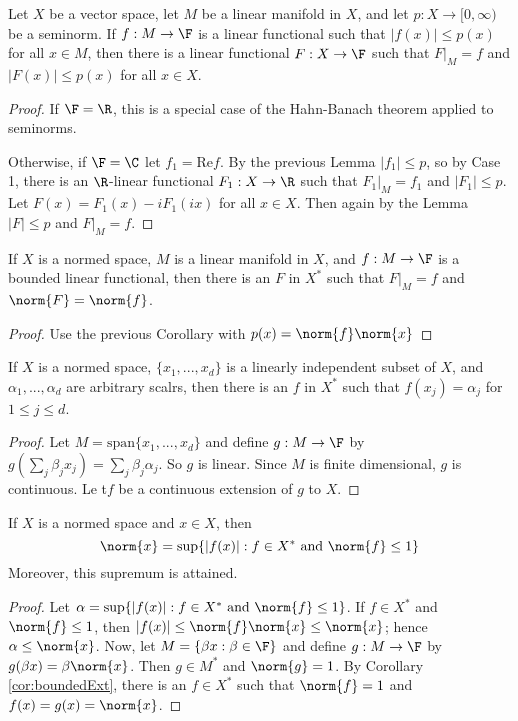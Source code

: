 \begin{cor}
    Let $X$ be a vector space, let $M$ be a linear manifold in $X$, and let $p:X\rightarrow [0,\infty)$ be a seminorm. If $f:M\rightarrow \F$ is a linear functional such that $|f(x)| \leq p(x)$ for all $x \in M$, then there is a linear functional $F:X\rightarrow \F$ such that $F\vert_M = f$ and $|F(x)| \leq p(x)$ for all $x \in X$.
\end{cor}
\begin{proof}
    If $\F = \R$, this is a special case of the Hahn-Banach theorem applied to seminorms.

    Otherwise, if $\F = \C$ let $f_1 = \text{Re}f$. By the previous Lemma $|f_1| \leq p$, so by Case 1, there is an $\R$-linear functional $F_1:X\rightarrow \R$ such that $F_1\vert_M = f_1$ and $|F_1| \leq p$. Let $F(x) = F_1(x) - iF_1(ix)$ for all $x \in X$. Then again by the Lemma $|F| \leq p$ and $F\vert_M = f$.
\end{proof}

\begin{cor}\label{cor:boundedExt}
    If $X$ is a normed space, $M$ is a linear manifold in $X$, and $f:M\rightarrow \F$ is a bounded linear functional, then there is an $F$ in $X^*$ such that $F\vert_M = f$ and $\norm{F} = \norm{f}$.
\end{cor}
\begin{proof}
    Use the previous Corollary with $p(x) = \norm{f}\norm{x}$
\end{proof}

\begin{cor}
    If $X$ is a normed space, $\{x_1,...,x_d\}$ is a linearly independent subset of $X$, and $\alpha_1,...,\alpha_d$ are arbitrary scalrs, then there is an $f$ in $X^*$ such that $f(x_j) = \alpha_j$ for $1\leq j \leq d$.
\end{cor}
\begin{proof}
    Let $M = \text{span}\{x_1,...,x_d\}$ and define $g:M\rightarrow \F$ by $g(\sum_j\beta_jx_j) = \sum_j\beta_j\alpha_j$. So $g$ is linear. Since $M$ is finite dimensional, $g$ is continuous. Le t$f$ be a continuous extension of $g$ to $X$.
\end{proof}

\begin{cor}
    If $X$ is a normed space and $x \in X$, then $$\norm{x} = \sup\{|f(x)|:f \in X^*\text{ and }\norm{f}\leq 1\}$$
    Moreover, this supremum is attained.
\end{cor}
\begin{proof}
    Let $\alpha = \sup\{|f(x)|:f\in X^*\text{ and }\norm{f} \leq 1\}$. If $f \in X^*$ and $\norm{f} \leq 1$, then $|f(x)| \leq \norm{f}\norm{x} \leq \norm{x}$; hence $\alpha \leq \norm{x}$. Now, let $M = \{\beta x: \beta \in \F\}$ and define $g:M\rightarrow \F$ by $g(\beta x) = \beta\norm{x}$. Then $g \in M^*$ and $\norm{g} = 1$. By Corollary \ref{cor:boundedExt}, there is an $f \in X^*$ such that $\norm{f} = 1$ and $f(x) = g(x) = \norm{x}$.
\end{proof}

